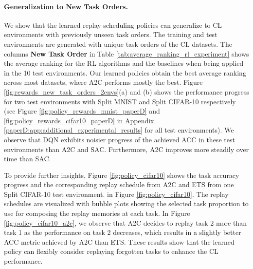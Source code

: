 \vspace{-3mm}
\paragraph{Generalization to New Task Orders.} 
We show that the learned replay scheduling policies can generalize to CL environments with previously unseen task orders. The training and test environments are generated with unique task orders of the CL datasets. The columns \textbf{New Task Order} in Table \ref{tab:average_ranking_rl_experiment} shows the average ranking for the RL algorithms and the baselines when being applied in the 10 test environments. 
Our learned policies obtain the best average ranking across most datasets, where A2C performs mostly the best. Figure \ref{fig:rewards_new_task_orders_2envs}(a) and (b) shows the performance progress for two test environments with Split MNIST and Split CIFAR-10 respectively (see Figure \ref{fig:policy_rewards_mnist_paperD} and \ref{fig:policy_rewards_cifar10_paperD} in Appendix \ref{paperD:app:additional_experimental_results} for all test environments). We observe that DQN exhibits noisier progress of the achieved ACC in these test environments than A2C and SAC. Furthermore, A2C improves more steadily over time than SAC.  

To provide further insights, Figure \ref{fig:policy_cifar10} shows the task accuracy progress and the corresponding replay schedule from A2C and ETS from one Split CIFAR-10 test environment. in Figure \ref{fig:policy_cifar10}. The replay schedules are visualized with bubble plots showing the selected task proportion to use for composing the replay memories at each task. In Figure \ref{fig:policy_cifar10_a2c}, we observe that A2C decides to replay task 2 more than task 1 as the performance on task 2 decreases, which results in a slightly better ACC metric achieved by A2C than ETS. These results show that the learned policy can flexibly consider replaying forgotten tasks to enhance the CL performance. 




